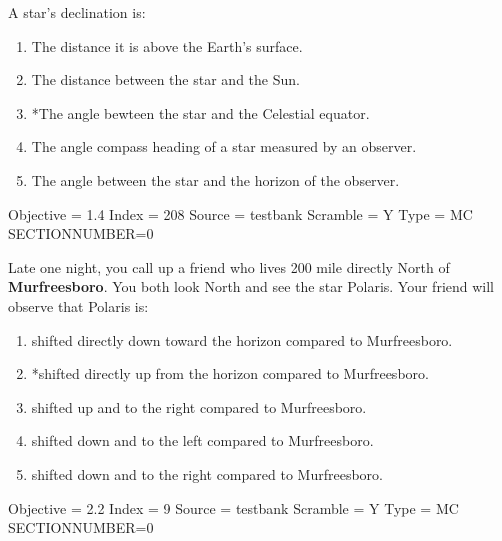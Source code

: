 \documentclass[11pt]{article}
\begin{document}
\begin{enumerate}
\begin{minipage}{\textwidth}
\begin{minipage}{\textwidth}
\item A star's declination is:
\begin{enumerate} 
\setlength{\itemsep}{1pt} 
\setlength{\parskip}{0pt} 
\setlength{\parsep}{0pt}
\setlength{\multicolsep}{1pt} 
\item The distance it is above the Earth's surface.
\item The distance between the star and the Sun.
\item *The angle bewteen the star and the Celestial equator.
\item The angle compass heading of a star measured by an observer.
\item The angle between the star and the horizon of the observer.
\end{enumerate} 
Objective = 1.4
Index = 208
Source = testbank
Scramble = Y
Type = MC
SECTIONNUMBER=0
\end{minipage}
\end{minipage}
\vskip 0.20in

\begin{minipage}{\textwidth}
\begin{minipage}{\textwidth}
\item Late one night, you call up a friend who lives 200 mile directly North of {\bf Murfreesboro}.   You both look North and see the star Polaris.  Your friend will observe that Polaris is:
\begin{enumerate} 
\setlength{\itemsep}{1pt} 
\setlength{\parskip}{0pt} 
\setlength{\parsep}{0pt}
\setlength{\multicolsep}{1pt} 
\item shifted directly down toward the horizon compared to Murfreesboro.
\item *shifted directly up from the horizon compared to  Murfreesboro.
\item shifted up and to the right compared to Murfreesboro.
\item shifted down and to the left  compared to Murfreesboro.
\item shifted down and to the right compared to Murfreesboro.
\end{enumerate} 
Objective = 2.2
Index = 9
Source = testbank
Scramble = Y
Type = MC
SECTIONNUMBER=0
\end{minipage}
\end{minipage}
\vskip 0.20in


\end{enumerate}
\end{document}
